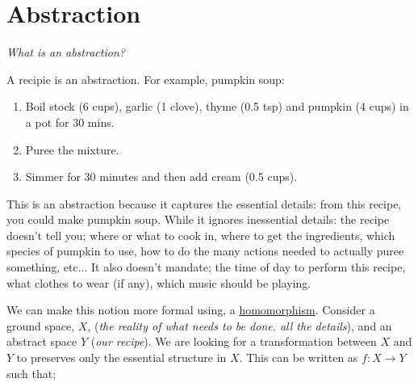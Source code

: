\chapter{Abstraction}\label{C:abstraction}


\begin{displayquote}
 \textit{What is an abstraction?}
\end{displayquote}

A recipie is an abstraction. For example, pumpkin soup:

\begin{enumerate}
\tightlist
\item Boil stock (6 cups), garlic (1 clove), thyme (0.5 tsp) and pumpkin (4 cups) in a pot for 30 mins.
\item Puree the mixture.
\item Simmer for 30 minutes and then add cream (0.5 cups).
\end{enumerate}

This is an abstraction because it captures the essential details: from this recipe, you could make pumpkin soup.
While it ignores inessential details: the recipe doesn't tell you; where or what to cook in, where to get the
ingredients, which species of pumpkin to use, how to do the many actions needed to actually puree something, etc...
It also doesn't mandate; the time of day to perform this recipe, what clothes to wear (if any),
which music should be playing.


\vspace{5mm}

We can make this notion more formal using, a  \href{https://en.wikipedia.org/wiki/Homomorphism}{homomorphism}.
Consider a ground space, $X$, (\textit{the reality of what
needs to be done. all the details}), and an abstract space $Y$ (\textit{our recipe}).
We are looking for a transformation between $X$ and $Y$ to preserves only the essential
structure in $X$. This can be written as $f: X\to Y$ such that;


